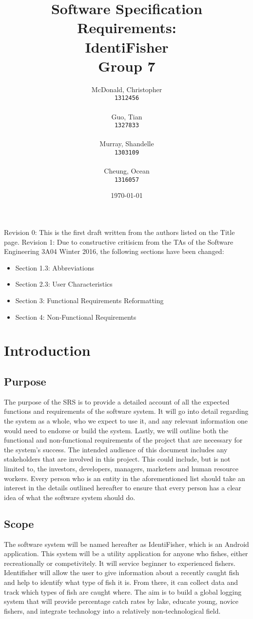 \documentclass{article}
\title{Software Specification Requirements: \\ IdentiFisher \\ Group 7 \\}
\author{
\Large McDonald, Christopher\\
\texttt{1312456} \\ \\
\Large Guo, Tian\\
\texttt{1327833} \\ \\
\Large Murray, Shandelle\\
\texttt{1303109} \\ \\
\Large Cheung, Ocean\\
\texttt{1316057} \\
}
\date{\today}
\begin{document}
\maketitle

\newpage
\tableofcontents
Revision 0: This is the first draft written from the authors listed on the Title page.
Revision 1: Due to constructive critisicm from the TAs of the Software Engineering 3A04 Winter 2016, the following sections have been changed:
\begin{itemize}
	\item Section 1.3: Abbreviations
	\item Section 2.3: User Characteristics 
	\item Section 3: Functional Requirements Reformatting
	\item Section 4: Non-Functional Requirements
\end{itemize}
\newpage
\section{Introduction}

\subsection{Purpose}
The purpose of the SRS is to provide a detailed account of all the expected functions
and requirements of the software system. It will go into detail regarding the system
as a whole, who we expect to use it, and any relevant information one would need
to endorse or build the system. Lastly, we will outline both the functional and
non-functional requirements of the project that are necessary for the system's
success. The intended audience of this document includes any stakeholders that are involved in this
project. This could include, but is not limited to, the investors, developers, managers,
marketers and human resource workers. Every person who is an entity in the aforementioned
list should take an interest in the details outlined hereafter to ensure that every person
has a clear idea of what the software system should do.

\subsection{Scope}
The software system will be named hereafter as IdentiFisher, which is an Android application.
This system will be a utility application for anyone who fishes, either recreationally or
competivitely. It will service beginner to experienced fishers. Identifisher will allow
the user to give information about a recently caught fish and help to identify what type
of fish it is. From there, it can collect data and track which types of fish are caught where. The aim is to
build a global logging system that will provide percentage catch rates by lake,
educate young, novice fishers, and integrate technology into a relatively non-technological field.
\end{document}
